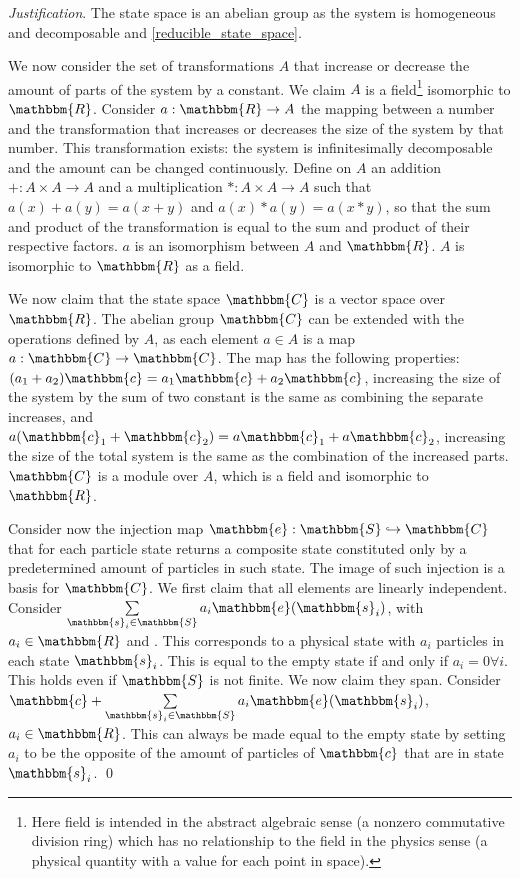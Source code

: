 \documentclass[aps,pra,10pt,twocolumn,floatfix,nofootinbib]{revtex4-1}
\theoremstyle{definition}
\newenvironment{justification}{\emph{Justification}.}{\qed}
\begin{document}
\begin{justification}
The state space is an abelian group as the system is homogeneous and decomposable and \ref{reducible_state_space}.

We now consider the set of transformations $A$ that increase or decrease the amount of parts of the system by a constant. We claim $A$ is a field\footnote{Here field is intended in the abstract algebraic sense (a nonzero commutative division ring) which has no relationship to the field in the physics sense (a physical quantity with a value for each point in space).} isomorphic to $\mathbbm{R}$. Consider $a: \mathbbm{R} \rightarrow A$ the mapping between a number and the transformation that increases or decreases the size of the system by that number. This transformation exists: the system is infinitesimally decomposable and the amount can be changed continuously. Define on $A$ an addition $+: A \times A \rightarrow A$ and a multiplication $*: A \times A \rightarrow A$ such that $a(x) + a(y) = a(x+y)$ and $a(x) * a(y) = a(x*y)$, so that the sum and product of the transformation is equal to the sum and product of their respective factors. $a$ is an isomorphism between $A$ and $\mathbbm{R}$. $A$ is isomorphic to $\mathbbm{R}$ as a field.

We now claim that the state space $\mathbbm{C}$ is a vector space over $\mathbbm{R}$. The abelian group $\mathbbm{C}$ can be extended with the operations defined by $A$, as each element $a \in A$ is a map $a : \mathbbm{C} \rightarrow \mathbbm{C}$. The map has the following properties: $(a_1 + a_2) \mathbbm{c} = a_1 \mathbbm{c} + a_2 \mathbbm{c}$, increasing the size of the system by the sum of two constant is the same as combining the separate increases, and $a (\mathbbm{c}_1 + \mathbbm{c}_2) = a \mathbbm{c}_1 + a \mathbbm{c}_2$, increasing the size of the total system is the same as the combination of the increased parts. $\mathbbm{C}$ is a module over $A$, which is a field and isomorphic to $\mathbbm{R}$.

Consider now the injection map $\mathbbm{e}: \mathbbm{S} \hookrightarrow \mathbbm{C}$ that for each particle state returns a composite state constituted only by a predetermined amount of particles in such state. The image of such injection is a basis for $\mathbbm{C}$. We first claim that all elements are linearly independent. Consider $\sum\limits_{\mathbbm{s}_i \in \mathbbm{S}} a_i \mathbbm{e}(\mathbbm{s}_i)$, with $a_i \in \mathbbm{R}$ and . This corresponds to a physical state with $a_i$ particles in each state $\mathbbm{s}_i$. This is equal to the empty state if and only if $a_i=0 \forall i$. This holds even if $\mathbbm{S}$ is not finite. We now claim they span. Consider $\mathbbm{c} + \sum\limits_{\mathbbm{s}_i \in \mathbbm{S}} a_i \mathbbm{e}(\mathbbm{s}_i)$, $a_i \in \mathbbm{R}$. This can always be made equal to the empty state by setting $a_i$ to be the opposite of the amount of particles of $\mathbbm{c}$ that are in state $\mathbbm{s}_i$.
\end{justification}
\end{document}
